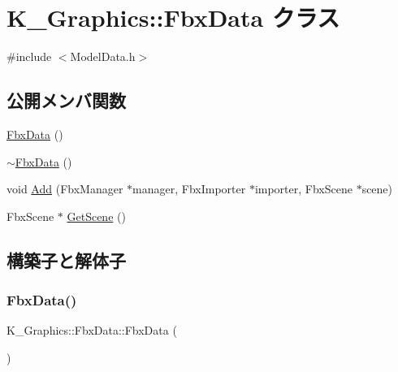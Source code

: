 \hypertarget{class_k___graphics_1_1_fbx_data}{}\section{K\+\_\+\+Graphics\+:\+:Fbx\+Data クラス}
\label{class_k___graphics_1_1_fbx_data}


{\ttfamily \#include $<$Model\+Data.\+h$>$}

\subsection*{公開メンバ関数}
\begin{DoxyCompactItemize}
\item 
\mbox{\hyperlink{class_k___graphics_1_1_fbx_data_a1b25093e5b12ec37a09ac4ced59164f7}{Fbx\+Data}} ()
\item 
\mbox{\hyperlink{class_k___graphics_1_1_fbx_data_a01a56a8cb8a0d39e5d049e4d6325532d}{$\sim$\+Fbx\+Data}} ()
\item 
void \mbox{\hyperlink{class_k___graphics_1_1_fbx_data_a7dd8e6081a69857bb6b2d40473bb8713}{Add}} (Fbx\+Manager $\ast$manager, Fbx\+Importer $\ast$importer, Fbx\+Scene $\ast$scene)
\item 
Fbx\+Scene $\ast$ \mbox{\hyperlink{class_k___graphics_1_1_fbx_data_a8271d5aa74bb8795fb601bcb60ce5f6f}{Get\+Scene}} ()
\end{DoxyCompactItemize}


\subsection{構築子と解体子}
\mbox{\label{class_k___graphics_1_1_fbx_data_a1b25093e5b12ec37a09ac4ced59164f7}} 
\subsubsection{\texorpdfstring{Fbx\+Data()}{FbxData()}}
{\footnotesize\ttfamily K\+\_\+\+Graphics\+::\+Fbx\+Data\+::\+Fbx\+Data (\begin{DoxyParamCaption}{ }\end{DoxyParamCaption})}

\mbox{\label{class_k___graphics_1_1_fbx_data_a01a56a8cb8a0d39e5d049e4d6325532d}} 
